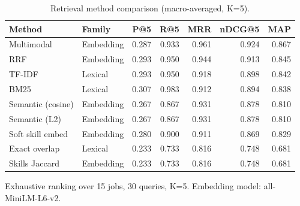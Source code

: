 \begin{table}[htbp]
\centering
\caption{Retrieval method comparison (macro-averaged, K=5).}
\label{tab:method-comparison}
\begin{tabular}{llrrrrr}
\toprule
Method & Family & P@5 & R@5 & MRR & nDCG@5 & MAP \\
\midrule
Multimodal & Embedding & 0.287 & 0.933 & 0.961 & 0.924 & 0.867 \\
RRF & Embedding & 0.293 & 0.950 & 0.944 & 0.913 & 0.845 \\
TF-IDF & Lexical & 0.293 & 0.950 & 0.918 & 0.898 & 0.842 \\
BM25 & Lexical & 0.307 & 0.983 & 0.912 & 0.894 & 0.838 \\
Semantic (cosine) & Embedding & 0.267 & 0.867 & 0.931 & 0.878 & 0.810 \\
Semantic (L2) & Embedding & 0.267 & 0.867 & 0.931 & 0.878 & 0.810 \\
Soft skill embed & Embedding & 0.280 & 0.900 & 0.911 & 0.869 & 0.829 \\
Exact overlap & Lexical & 0.233 & 0.733 & 0.816 & 0.748 & 0.681 \\
Skills Jaccard & Embedding & 0.233 & 0.733 & 0.816 & 0.748 & 0.681 \\
\bottomrule
\end{tabular}
\footnotesize{Exhaustive ranking over 15 jobs, 30 queries, K=5. Embedding model: all-MiniLM-L6-v2.}
\end{table}
